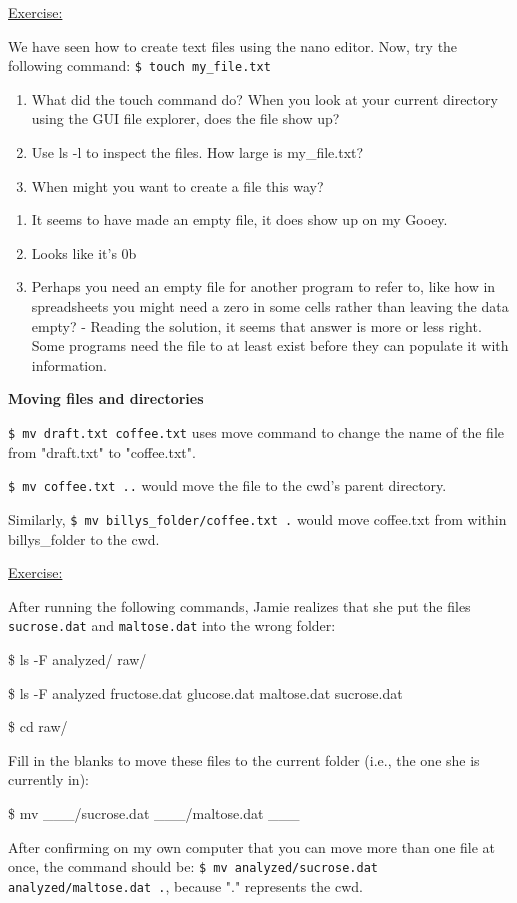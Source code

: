 \documentclass[12pt]{article}
\begin{document}
\begin{addmargin}[1cm]{0cm}
\vspace{1em}
\color{gray}
\underline{Exercise:}

We have seen how to create text files using the nano editor. Now, try the following command: \texttt{\$ touch my\_file.txt}

\begin{enumerate}
    \item What did the touch command do? When you look at your current directory using the GUI file explorer, does the file show up?
    \item Use ls -l to inspect the files. How large is my\_file.txt?
    \item When might you want to create a file this way?
\end{enumerate}
\color{black}
\begin{enumerate}
    \item It seems to have made an empty file, it does show up on my Gooey.
    \item Looks like it's 0b
    \item Perhaps you need an empty file for another program to refer to, like how in spreadsheets you might need a zero in some cells rather than leaving the data empty? - Reading the solution, it seems that answer is more or less right. Some programs need the file to at least exist before they can populate it with information. 
\end{enumerate}
\end{addmargin}

\newpage\textbf{Moving files and directories}

\texttt{\$ mv draft.txt coffee.txt} uses move command to change the name of the file from "draft.txt" to "coffee.txt".

\texttt{\$ mv coffee.txt ..} would move the file to the cwd's parent directory.

Similarly, \texttt{\$ mv billys\_folder/coffee.txt .} would move coffee.txt from within billys\_folder to the cwd.

\begin{addmargin}[1cm]{0cm}
\vspace{1em}
\color{gray}
\underline{Exercise:}

After running the following commands, Jamie realizes that she put the files \texttt{sucrose.dat} and \texttt{maltose.dat} into the wrong folder:

\$ ls -F
 analyzed/ raw/

\$ ls -F analyzed
fructose.dat glucose.dat maltose.dat sucrose.dat

\$ cd raw/

Fill in the blanks to move these files to the current folder (i.e., the one she is currently in):

\$ mv \_\_\_/sucrose.dat  \_\_\_/maltose.dat \_\_\_

\vspace{1em}
\color{black}
After confirming on my own computer that you can move more than one file at once, the command should be: \texttt{\$ mv analyzed/sucrose.dat analyzed/maltose.dat .}, because "." represents the cwd.
\end{addmargin}
\end{document}
